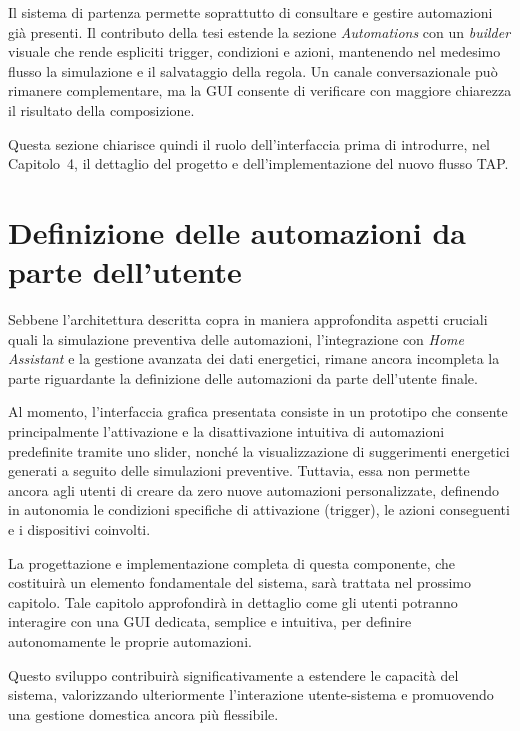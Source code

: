 Il sistema di partenza permette soprattutto di consultare e gestire automazioni gi\`a presenti. Il contributo della tesi estende la sezione \textit{Automations} con un \textit{builder} visuale che rende espliciti trigger, condizioni e azioni, mantenendo nel medesimo flusso la simulazione e il salvataggio della regola. Un canale conversazionale pu\`o rimanere complementare, ma la GUI consente di verificare con maggiore chiarezza il risultato della composizione.

Questa sezione chiarisce quindi il ruolo dell'interfaccia prima di introdurre, nel Capitolo~4, il dettaglio del progetto e dell'implementazione del nuovo flusso TAP.

\section{Definizione delle automazioni da parte dell'utente}

Sebbene l'architettura descritta copra in maniera approfondita aspetti cruciali quali la simulazione preventiva delle automazioni, l'integrazione con \textit{Home Assistant} e la gestione avanzata dei dati energetici, rimane ancora incompleta la parte riguardante la definizione delle automazioni da parte dell'utente finale.

Al momento, l'interfaccia grafica presentata consiste in un prototipo che consente principalmente l'attivazione e la disattivazione intuitiva di automazioni predefinite tramite uno slider, nonché la visualizzazione di suggerimenti energetici generati a seguito delle simulazioni preventive. Tuttavia, essa non permette ancora agli utenti di creare da zero nuove automazioni personalizzate, definendo in autonomia le condizioni specifiche di attivazione (trigger), le azioni conseguenti e i dispositivi coinvolti.

La progettazione e implementazione completa di questa componente, che costituirà un elemento fondamentale del sistema, sarà trattata nel prossimo capitolo. Tale capitolo approfondirà in dettaglio come gli utenti potranno interagire con una GUI dedicata, semplice e intuitiva, per definire autonomamente le proprie automazioni.

Questo sviluppo contribuirà significativamente a estendere le capacità del sistema, valorizzando ulteriormente l'interazione utente-sistema e promuovendo una gestione domestica ancora più flessibile.
